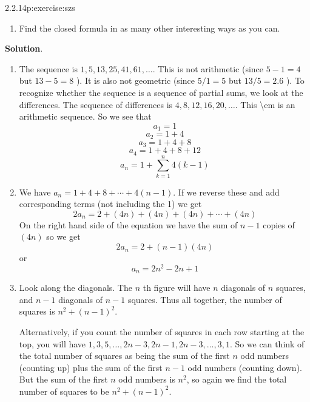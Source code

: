 \documentclass[twoside,11pt,]{book}
\newcommand{\blocktitlefont}{\relax}
\numberwithin{equation}{chapter}
\begin{document}
\begin{divisionsolution}{2.2.14}{}{p:exercise:szs}
\begin{enumerate}[label=(\alph*)]
\item{}Find the closed formula in as many other interesting ways as you can.%
\end{enumerate}
%
\par\smallskip%
\noindent\textbf{\blocktitlefont Solution}.\quad{}%
\begin{enumerate}[label=(\alph*)]
\item{}The sequence is \(1, 5, 13, 25, 41, 61, \ldots\). This is not arithmetic (since \(5-1 = 4\) but \(13-5 = 8\) ). It is also not geometric (since \(5/1 = 5\) but \(13/5 = 2.6\) ). To recognize whether the sequence is a sequence of partial sums, we look at the differences. The sequence of differences is \(4, 8, 12, 16, 20, \ldots\). This \textbraceleft{}\textbackslash{}em is\textbraceright{} an arithmetic sequence. So we see that%
\begin{equation*}
a_1 = 1
\end{equation*}
%
\begin{equation*}
a_2 = 1+4
\end{equation*}
%
\begin{equation*}
a_3 = 1+4+8
\end{equation*}
%
\begin{equation*}
a_4 = 1+4+8+12
\end{equation*}
%
\begin{equation*}
a_n = 1 + \sum_{k = 1}^n 4(k-1)
\end{equation*}
%
\item{}We have \(a_n = 1 + 4 + 8 + \cdots + 4(n-1)\). If we reverse these and add corresponding terms (not including the 1) we get%
\begin{equation*}
2a_n = 2 + (4n) + (4n) + (4n) + \cdots + (4n)
\end{equation*}
On the right hand side of the equation we have the sum of \(n-1\) copies of \((4n)\) so we get%
\begin{equation*}
2a_n = 2 + (n-1)(4n)
\end{equation*}
or%
\begin{equation*}
a_n = 2n^2 - 2n + 1
\end{equation*}
%
\item{}Look along the diagonals. The \(n\) th figure will have \(n\) diagonals of \(n\) squares, and \(n-1\) diagonals of \(n-1\) squares. Thus all together, the number of squares is \(n^2 + (n-1)^2\).%
\par
Alternatively, if you count the number of squares in each row starting at the top, you will have \(1, 3, 5, \ldots, 2n-3, 2n-1, 2n-3, \ldots, 3, 1\). So we can think of the total number of squares as being the sum of the first \(n\) odd numbers (counting up) plus the sum of the first \(n-1\) odd numbers (counting down). But the sum of the first \(n\) odd numbers is \(n^2\), so again we find the total number of squares to be \(n^2 + (n-1)^2\).%

\end{enumerate}
\end{divisionsolution}
\end{document}
